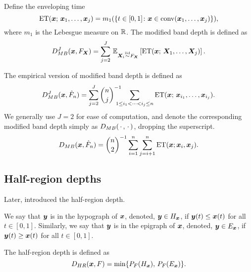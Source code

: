 \begin{definition}
    Define the enveloping time
    \begin{equation}
        \operatorname{ET}(\bm{x};\, \bm{x}_1, \dots, \bm{x}_j) = m_1(\{t \in [0, 1]\colon \bm{x} \in \operatorname{conv}(\bm{x}_1, \dots, \bm{x}_j)\}),
    \end{equation}
    where $m_1$ is the Lebesgue measure on $\mathbb{R}$.
    The modified band depth is defined as
    \begin{equation}
        D_{MB}^J(\bm{x}, F_{\bm{X}}) = \sum_{j = 2}^J\, \operatorname{\mathbb{E}}_{\bm{X}_i \overset{\text{iid}}{\sim} F_{\bm{X}}}\left[ \operatorname{ET}(\bm{x};\, \bm{X}_1, \dots, \bm{X}_j)\right].
    \end{equation}
\end{definition}
The empirical version of modified band depth is defined as
\begin{equation}
    D_{MB}^J(\bm{x}, \hat{F}_n) = \sum_{j = 2}^J\binom{n}{j}^{-1} \hspace{-1em} \sum_{\substack{1 \leq i_1 < \dots < i_j \leq n}} \operatorname{ET}(\bm{x};\, \bm{x}_{i_1}, \dots, \bm{x}_{i_j}).
\end{equation}
We generally use $J = 2$ for ease of computation, and denote the corresponding
modified band depth simply as $D_{MB}(\,\cdot\,, \,\cdot\,)$, dropping the
superscript.
\begin{equation}
    D_{MB}(\bm{x}, \hat{F}_n) = \binom{n}{2}^{-1}\sum_{i = 1}^n\sum_{j = i + 1}^n \operatorname{ET}(\bm{x}; \bm{x}_i, \bm{x}_j).
\end{equation}



\subsection{Half-region depths}

Later, \textcite{pintado-romo-2011} introduced the half-region depth.

\begin{definition}
    We say that $\bm{y}$ is in the hypograph of $\bm{x}$, denoted, $\bm{y} \in
    H_{\bm{x}}$, if $\bm{y}(t) \leq \bm{x}(t)$ for all $t \in [0, 1]$.
    Similarly, we say that $\bm{y}$ is in the epigraph of $\bm{x}$, denoted, $\bm{y}
    \in E_{\bm{x}}$, if $\bm{y}(t) \geq \bm{x}(t)$ for all $t \in [0, 1]$.
\end{definition}

\begin{definition}
    The half-region depth is defined as
    \begin{equation}
        D_{HR}(\bm{x}, F) = \min\{P_F(H_{\bm{x}}),\, P_F(E_{\bm{x}})\}.
    \end{equation}
\end{definition}

